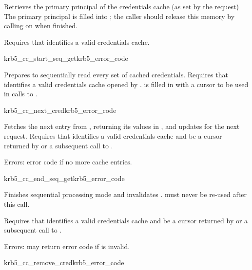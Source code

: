 Retrieves the primary principal of the credentials cache (as
set by the  request)
The primary principal is filled into ; the caller
should release this memory by calling  on
 when finished.

Requires that  identifies a valid credentials cache.

\begin{funcdecl}{krb5_cc_start_seq_get}{krb5_error_code}{\funcin}
\funcout
{}
\end{funcdecl}

Prepares to sequentially read every set of cached credentials.
Requires that  identifies a valid credentials cache opened by
.
 is filled in with a cursor to be used in calls to
.

\begin{funcdecl}{krb5_cc_next_cred}{krb5_error_code}{\funcin}
\funcout
{}
\funcinout
{}
\end{funcdecl}

Fetches the next entry from , returning its values in
, and updates  for the next request.
Requires that  identifies a valid credentials cache and
 be a cursor returned by
 or a subsequent call to
.

Errors: error code if no more cache entries.

\begin{funcdecl}{krb5_cc_end_seq_get}{krb5_error_code}{\funcin}
\end{funcdecl}

Finishes sequential processing mode and invalidates .
 must never be re-used after this call.

Requires that  identifies a valid credentials cache and
 be a cursor returned by
 or a subsequent call to
.

Errors: may return error code if  is invalid.


\begin{funcdecl}{krb5_cc_remove_cred}{krb5_error_code}{\funcin}
\end{funcdecl}

